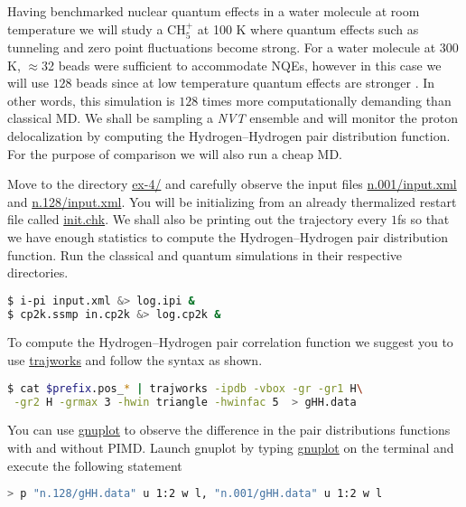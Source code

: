 \documentclass{article}
\begin{document}
\begin{Exercise}[label={ch5},title={PIMD in the strong quantum regime:  gas phase Methanium}]
\noindent Having benchmarked nuclear quantum effects in a water molecule at room temperature 
we will study a $\text{CH}_{5}^{+}$ at 100 K where quantum effects such as tunneling and 
zero point fluctuations become strong. For a water molecule at $300$K, $\approx$32 beads were 
sufficient to accommodate NQEs, however in this case we will use $128$ beads since at low 
temperature quantum effects are stronger . In other words, this simulation is $128$ times more computationally 
demanding than classical MD. We shall be sampling a \emph{NVT} ensemble and will monitor the 
proton delocalization by computing the Hydrogen--Hydrogen pair distribution function. For the 
purpose of comparison we will also run a cheap MD.

\Question
Move to the directory \url{ex-4/} and carefully observe the \ipi{} input files \url{n.001/input.xml} 
and \url{n.128/input.xml}. You will be initializing from an already thermalized restart file called 
\url{init.chk}. We shall also be printing out the trajectory every $1$fs so that we have enough 
statistics to compute the Hydrogen--Hydrogen pair distribution function. Run the classical and 
quantum simulations in their respective directories.

\begin{lstlisting}[language=bash]
$ i-pi input.xml &> log.ipi &
$ cp2k.ssmp in.cp2k &> log.cp2k &
\end{lstlisting}

\Question
To compute the Hydrogen--Hydrogen pair correlation function we suggest you to use \url{trajworks} and follow the syntax as shown. 
\begin{lstlisting}[language=bash]
$ cat $prefix.pos_* | trajworks -ipdb -vbox -gr -gr1 H\
 -gr2 H -grmax 3 -hwin triangle -hwinfac 5  > gHH.data 
\end{lstlisting}

\Question
You can use \url{gnuplot} to observe the difference in the pair distributions functions with and without PIMD. 
Launch gnuplot by typing \url{gnuplot} on the terminal and execute the following statement 
\begin{lstlisting}[language=bash]
> p "n.128/gHH.data" u 1:2 w l, "n.001/gHH.data" u 1:2 w l
\end{lstlisting}

\end{Exercise}



\end{document}
